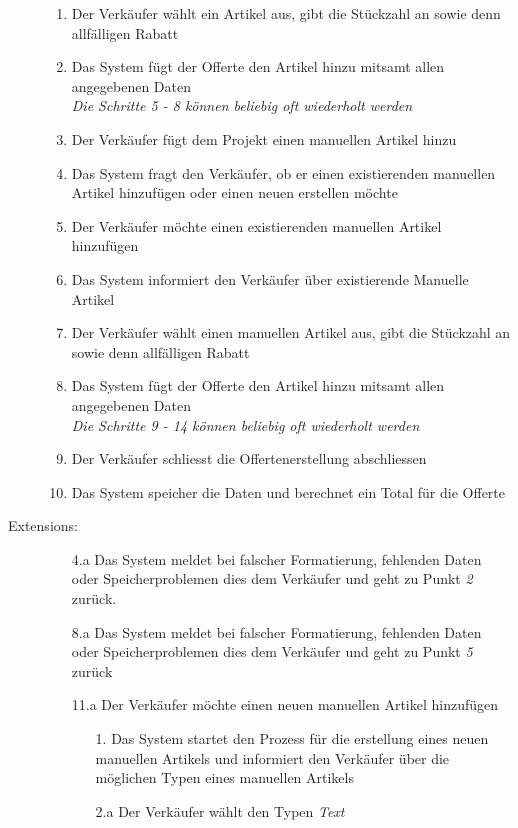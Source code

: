 \documentclass[a4paper,12pt]{article}
\begin{document}
\begin{description}
\begin{enumerate}
			\item Der Verkäufer wählt ein Artikel aus, gibt die Stückzahl an sowie 
			denn allfälligen Rabatt
			\item Das System fügt der Offerte den Artikel hinzu mitsamt allen angegebenen Daten\\
			\emph{Die Schritte 5 - 8 können beliebig oft wiederholt werden}
			\item Der Verkäufer fügt dem Projekt einen manuellen Artikel hinzu
			\item Das System fragt den Verkäufer, ob er einen existierenden manuellen Artikel hinzufügen 
			oder einen neuen erstellen möchte
			\item Der Verkäufer möchte einen existierenden manuellen Artikel hinzufügen
			\item Das System informiert den Verkäufer über existierende Manuelle Artikel
			\item Der Verkäufer wählt einen manuellen Artikel aus, gibt die Stückzahl an sowie 
			denn allfälligen Rabatt
			\item Das System fügt der Offerte den Artikel hinzu mitsamt allen angegebenen Daten\\
			\emph{Die Schritte 9 - 14 können beliebig oft wiederholt werden}
			\item Der Verkäufer schliesst die Offertenerstellung abschliessen
			\item Das System speicher die Daten und berechnet ein Total für die Offerte
		\end{enumerate}
		\newpage
		\item[Extensions:] \hfill  
		\begin{enumerate}
			\item [4.a] Das System meldet bei falscher Formatierung, fehlenden Daten
			oder Speicherproblemen dies dem Verkäufer und geht zu Punkt \emph{2} zurück.
			\item [8.a] Das System meldet bei falscher Formatierung, fehlenden Daten
			oder Speicherproblemen dies dem Verkäufer und geht zu Punkt \emph{5} zurück
			\item [11.a] Der Verkäufer möchte einen neuen manuellen Artikel hinzufügen
			\begin{enumerate}
				\item[1.] Das System startet den Prozess für die erstellung eines neuen manuellen Artikels
				und informiert den Verkäufer über die möglichen Typen eines manuellen Artikels
				\item[2.a] Der Verkäufer wählt den Typen \emph{Text}

\end{enumerate}
\end{enumerate}
\end{description}
\end{document}
